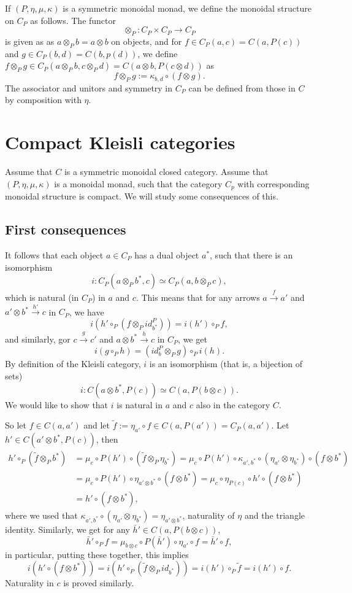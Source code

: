 \documentclass[12pt]{article}
\theoremstyle{definition}
\theoremstyle{remark}
\begin{document}
If $(P,\eta,\mu,\kappa)$ is a symmetric monoidal monad, we define the monoidal structure
on  $C_P$ as follows. The functor
\[
\otimes_P: C_P\times C_P\to C_P
\]
is given as as $a\otimes_P b=a\otimes b$ on objects, and for $f\in C_P(a,c)=C(a,P(c))$ and $g\in
C_P(b,d)=C(b,p(d))$, we define $f\otimes_P g\in C_P(a\otimes_P b, c\otimes_P d)=C(a\otimes
b, P(c\otimes d))$ as
\[
f\otimes_P g:= \kappa_{b,d}\circ (f\otimes g).
\]
The associator and unitors  and symmetry in $C_P$ can be defined from those in $C$ by composition with
$\eta$. 


\section{Compact Kleisli categories}

Assume that $C$ is a symmetric monoidal closed category. Assume that $(P,\eta,\mu,\kappa)$ is a
monoidal monad, such that the category $C_p$ with corresponding monoidal structure is
compact. We will study some consequences of this. 

\medskip

\subsection{First consequences}
It follows that each object $a\in C_P$ has a dual object $a^*$, such that there is an
isomorphism
\[
i:C_P(a\otimes_P b^*,c)\simeq C_P(a,b\otimes_P c),
\]
which is natural (in $C_P$) in $a$ and $c$. This means that for any arrows
$a\xrightarrow{f} a'$ and $a'\otimes b^*\xrightarrow{h'} c$ in $C_P$, we have
\[
i(h'\circ_P (f\otimes_P id_{b^*}^P))=i(h')\circ_P f,
\]
and similarly, gor $c\xrightarrow{g} c'$ and $a\otimes b^*\xrightarrow{h} c$ in $C_P$, we get
\[
i(g\circ_P h)=(id_b^P\otimes_P g)\circ_P i(h).
\]
By definition of the Kleisli category, $i$ is an isomorphism (that is, a bijection of
sets)
\[
i: C(a\otimes b^*,P(c))\simeq C(a,P(b\otimes c)).
\]
We would like to show that $i$ is natural in $a$ and $c$ also in the category $C$.

So let $f\in C(a,a')$ and let $\tilde f:= \eta_{a'}\circ f\in C(a, P(a'))=C_P(a,a')$. 
Let $h'\in C(a'\otimes b^*, P(c))$, then 
\begin{align*}
h'\circ_P (\tilde f\otimes_P b^*)&=\mu_c\circ P(h')\circ (\tilde f\otimes_P \eta_{b^*})=\mu_c\circ P(h')\circ \kappa_{a',b^*}\circ
(\eta_{a'}\otimes \eta_{b^*})\circ (f\otimes b^*)\\
&= \mu_c\circ P(h')\circ \eta_{a'\otimes b^*}\circ (f\otimes b^*)=\mu_c\circ
\eta_{P(c)}\circ h'\circ (f\otimes b^*)\\
&= h'\circ(f\otimes b^*),
\end{align*}
where we used that $\kappa_{a',b^*}\circ
(\eta_{a'}\otimes \eta_{b^*})=\eta_{a'\otimes b^*}$, naturality of $\eta$ and the
triangle identity. 
Similarly, we get for any $\bar h'\in C(a, P(b\otimes c))$,
\[
\bar h'\circ_Pf=\mu_{b\otimes c}\circ P(\bar h')\circ \eta_{a'}\circ f=\bar h'\circ f,
\]
in particular, putting these together, this implies 
\[
i(h'\circ(f\otimes b^*))= i(h'\circ_P(\tilde f\otimes_P id_{b^*}))=i(h')\circ_P\tilde
f=i(h')\circ f.
\]
Naturality in $c$ is proved similarly.
\end{document}
